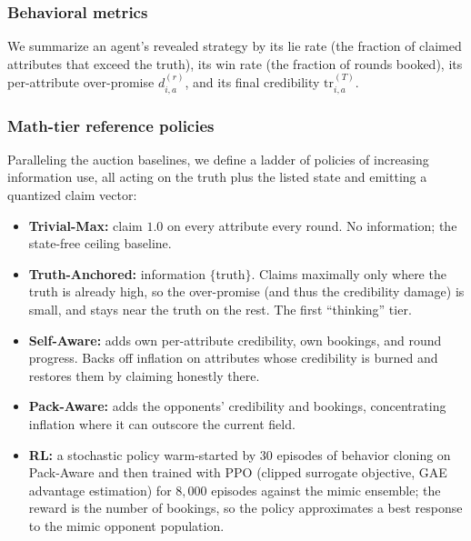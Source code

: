 \documentclass[conference]{IEEEtran}
\begin{document}
\subsubsection{Behavioral metrics}
We summarize an agent's revealed strategy by its lie rate (the fraction of claimed attributes that exceed the truth), its win rate (the fraction of rounds booked), its per-attribute over-promise $d_{i,a}^{(r)}$, and its final credibility $\mathrm{tr}_{i,a}^{(T)}$.

\subsubsection{Math-tier reference policies}
\label{sec:dec5-tiers}
Paralleling the auction baselines, we define a ladder of policies of increasing information use, all acting on the truth plus the listed state and emitting a quantized claim vector:
\begin{itemize}
\item \textbf{Trivial-Max:} claim $1.0$ on every attribute every round. No information; the state-free ceiling baseline.
\item \textbf{Truth-Anchored:} information $\{$truth$\}$. Claims maximally only where the truth is already high, so the over-promise (and thus the credibility damage) is small, and stays near the truth on the rest. The first ``thinking'' tier.
\item \textbf{Self-Aware:} adds own per-attribute credibility, own bookings, and round progress. Backs off inflation on attributes whose credibility is burned and restores them by claiming honestly there.
\item \textbf{Pack-Aware:} adds the opponents' credibility and bookings, concentrating inflation where it can outscore the current field.
\item \textbf{RL:} a stochastic policy warm-started by $30$ episodes of behavior cloning on Pack-Aware and then trained with PPO (clipped surrogate objective, GAE advantage estimation) for $8{,}000$ episodes against the mimic ensemble; the reward is the number of bookings, so the policy approximates a best response to the mimic opponent population.
\end{itemize}
\end{document}
